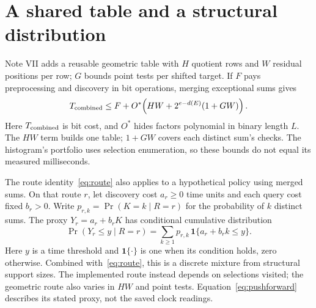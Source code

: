 \documentclass[10pt,english]{article}
\begin{document}
\section{A shared table and a structural distribution}
Note VII adds a reusable geometric table with $H$ quotient rows and $W$
residual positions per row; $G$ bounds point tests per shifted target. If
$F$ pays preprocessing and discovery in bit operations, merging exceptional
sums gives
\begin{equation}
 T_{\rm combined}\le F+O^*\!\left(HW+2^{e-d(E)}(1+GW)\right).
 \label{eq:geom}
\end{equation}
Here $T_{\rm combined}$ is bit cost, and $O^*$ hides factors polynomial in
binary length $L$. The $HW$ term builds one table; $1+GW$ covers each
distinct sum's checks. The histogram's portfolio uses selection enumeration,
so these bounds do not equal its measured milliseconds.

The route identity~\eqref{eq:route} also applies to a hypothetical policy
using merged sums. On that route $r$, let discovery cost $a_r\ge0$ time units
and each query cost fixed $b_r>0$. Write
$p_{r,k}=\Pr(K=k\mid R=r)$ for the probability of $k$ distinct sums. The
proxy $Y_r=a_r+b_rK$ has conditional cumulative distribution
\begin{equation}
 \Pr(Y_r\le y\mid R=r)
 =\sum_{k\ge1}p_{r,k}\,\mathbf 1\{a_r+b_rk\le y\}.
 \label{eq:pushforward}
\end{equation}
Here $y$ is a time threshold and $\mathbf1\{\cdot\}$ is one when its condition
holds, zero otherwise. Combined with~\eqref{eq:route}, this is a discrete
mixture from structural support sizes. The implemented route instead depends
on selections visited; the geometric route also varies in $HW$ and point
tests. Equation~\eqref{eq:pushforward} describes its stated proxy, not the
saved clock readings.
\end{document}
